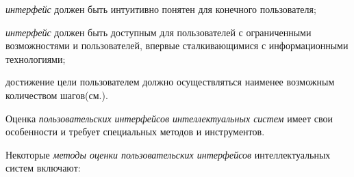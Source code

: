 \begin{textitemize}
	\item \textit{интерфейс} должен быть интуитивно понятен для конечного пользователя;
	\item \textit{интерфейс} должен быть доступным для пользователей с ограниченными возможностями и пользователей, впервые сталкивающимися с информационными технологиями;
	\item достижение цели пользователем должно осуществляться наименее возможным количеством шагов(см.).
\end{textitemize}

Оценка \textit{пользовательских интерфейсов интеллектуальных систем} имеет свои особенности и требует специальных методов и инструментов.

Некоторые \textit{методы оценки пользовательских интерфейсов} интеллектуальных систем включают:
